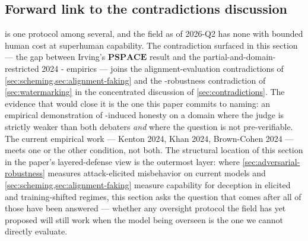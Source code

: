 \subsection{Forward link to the contradictions discussion}
\label{sec:oversight-forward}

 is one protocol among several, and the field as of 2026-Q2 has
none with bounded human cost at superhuman capability. The
contradiction surfaced in this section --- the gap between Irving's
$\mathbf{PSPACE}$ result and the partial-and-domain-restricted 2024
- empirics --- joins the alignment-evaluation contradictions
of \cref{sec:scheming,sec:alignment-faking} and the -robustness
contradiction of \cref{sec:watermarking} in the concentrated discussion
of \cref{sec:contradictions}. The evidence that would close it is the
one this paper commits to naming: an empirical demonstration of
-induced honesty on a domain where the judge is strictly weaker
than both debaters \emph{and} where the question is not pre-verifiable.
The current empirical work --- Kenton 2024, Khan 2024, Brown-Cohen
2024 --- meets one or the other condition, not both. The structural
location of this section in the paper's layered-defense view is the
outermost layer: where \cref{sec:adversarial-robustness} measures
attack-elicited misbehavior on current models and
\cref{sec:scheming,sec:alignment-faking} measure capability for
deception in elicited and training-shifted regimes, this section asks
the question that comes after all of those have been answered ---
whether any oversight protocol the field has yet proposed will still
work when the model being overseen is the one we cannot directly
evaluate.
